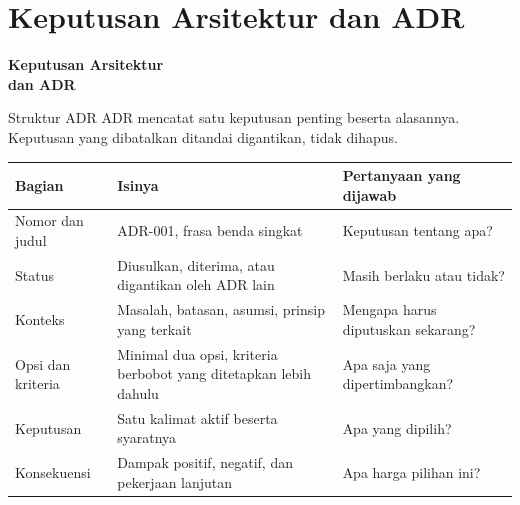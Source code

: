 \documentclass[aspectratio=169, table, 12pt]{beamer}
\begin{document}
\section{Keputusan Arsitektur dan ADR}

\begin{frame}{\hfill}
  \centering
  \Huge{\textbf{Keputusan Arsitektur\\dan ADR}}
\end{frame}

\begin{frame}{{\Large Struktur ADR}}
  \small ADR mencatat satu keputusan penting beserta alasannya. Keputusan yang dibatalkan ditandai
  digantikan, tidak dihapus.

  \vspace{4pt}
  \footnotesize
  \begin{tabularx}{\textwidth}{L{2.5cm}YL{4.0cm}}
    \hline
    \textbf{Bagian} & \textbf{Isinya} & \textbf{Pertanyaan yang dijawab} \\
    \hline
    Nomor dan judul & ADR-001, frasa benda singkat & Keputusan tentang apa? \\
    \hline
    Status & Diusulkan, diterima, atau digantikan oleh ADR lain & Masih berlaku atau tidak? \\
    \hline
    Konteks & Masalah, batasan, asumsi, prinsip yang terkait & Mengapa harus diputuskan sekarang? \\
    \hline
    Opsi dan kriteria & Minimal dua opsi, kriteria berbobot yang ditetapkan lebih dahulu & Apa saja yang dipertimbangkan? \\
    \hline
    Keputusan & Satu kalimat aktif beserta syaratnya & Apa yang dipilih? \\
    \hline
    Konsekuensi & Dampak positif, negatif, dan pekerjaan lanjutan & Apa harga pilihan ini? \\
    \hline
  \end{tabularx}
\end{frame}
\end{document}
